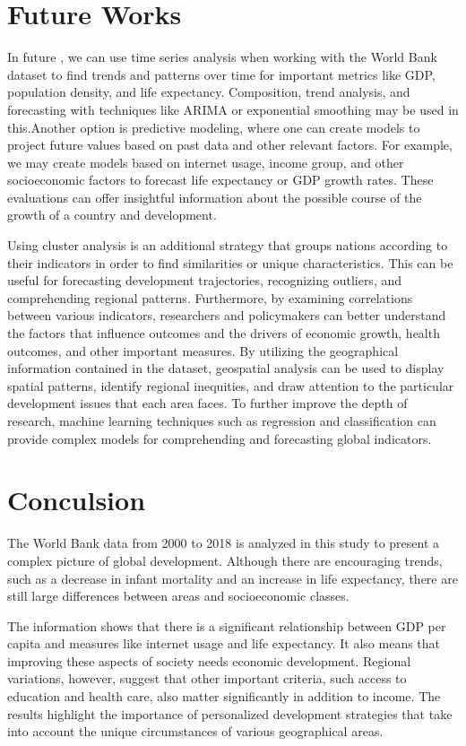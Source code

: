 \documentclass{article}\usepackage[]{graphicx}\usepackage[]{xcolor}
\begin{document}
\section{Future Works}
In future , we can use time series analysis when working with the World Bank dataset to find trends and patterns over time for important metrics like GDP, population density, and life expectancy. Composition, trend analysis, and forecasting with techniques like ARIMA or exponential smoothing may be used in this.Another option is predictive modeling, where one can create models to project future values based on past data and other relevant factors. For example, we may create models based on internet usage, income group, and other socioeconomic factors to forecast life expectancy or GDP growth rates. These evaluations can offer insightful information about the possible course of the growth of a country and development.\citep{siami2018comparison}\hfill \break

Using cluster analysis is an additional strategy that groups nations according to their indicators in order to find similarities or unique characteristics. This can be useful for forecasting development trajectories, recognizing outliers, and comprehending regional patterns. Furthermore, by examining correlations between various indicators, researchers and policymakers can better understand the factors that influence outcomes and the drivers of economic growth, health outcomes, and other important measures. By utilizing the geographical information contained in the dataset, geospatial analysis can be used to display spatial patterns, identify regional inequities, and draw attention to the particular development issues that each area faces. To further improve the depth of research, machine learning techniques such as regression and classification can provide complex models for comprehending and forecasting global indicators.\citep{wierzchon2018modern}

\section{Conculsion}
The World Bank data from 2000 to 2018 is analyzed in this study to present a complex picture of global development. Although there are encouraging trends, such as a decrease in infant mortality and an increase in life expectancy, there are still large differences between areas and socioeconomic classes.

The information shows that there is a significant relationship between GDP per capita and measures like internet usage and life expectancy. It also means that improving these aspects of society needs economic development. Regional variations, however, suggest that other important criteria, such access to education and health care, also matter significantly in addition to income.
The results highlight the importance of personalized development strategies that take into account the unique circumstances of various geographical areas. 



\end{document}

